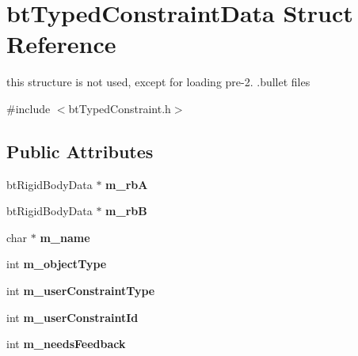\hypertarget{structbtTypedConstraintData}{}\section{bt\+Typed\+Constraint\+Data Struct Reference}
\label{structbtTypedConstraintData}


this structure is not used, except for loading pre-\/2. .bullet files  




{\ttfamily \#include $<$bt\+Typed\+Constraint.\+h$>$}

\subsection*{Public Attributes}
\begin{DoxyCompactItemize}
\item 
\mbox{\label{structbtTypedConstraintData_a416de1f0814c4c314d981f7f7417a00c}} 
bt\+Rigid\+Body\+Data $\ast$ {\bfseries m\+\_\+rbA}
\item 
\mbox{\label{structbtTypedConstraintData_a7e49818406b4c1c3e8a30b1bbeb8ba1a}} 
bt\+Rigid\+Body\+Data $\ast$ {\bfseries m\+\_\+rbB}
\item 
\mbox{\label{structbtTypedConstraintData_a84a6d4292b941c76c959c0925de227c0}} 
char $\ast$ {\bfseries m\+\_\+name}
\item 
\mbox{\label{structbtTypedConstraintData_a90328a5349c208bedbd01b2842dec893}} 
int {\bfseries m\+\_\+object\+Type}
\item 
\mbox{\label{structbtTypedConstraintData_a21d2705048b7d78783b884b4eb07694b}} 
int {\bfseries m\+\_\+user\+Constraint\+Type}
\item 
\mbox{\label{structbtTypedConstraintData_ad7d64995bdaacfe70a8df2116073889f}} 
int {\bfseries m\+\_\+user\+Constraint\+Id}
\item 
\mbox{\label{structbtTypedConstraintData_a32362fd496f74fc2f6b491359a061e0b}} 
int {\bfseries m\+\_\+needs\+Feedback}

\end{DoxyCompactItemize}
